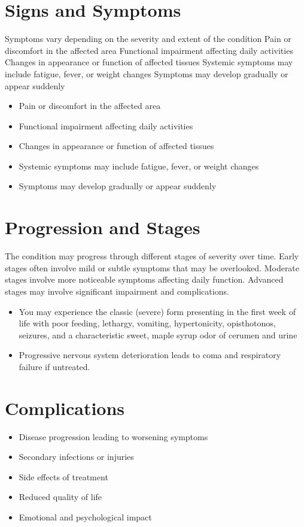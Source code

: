 \section{Signs and Symptoms}
Symptoms vary depending on the severity and extent of the condition Pain or discomfort in the affected area Functional impairment affecting daily activities Changes in appearance or function of affected tissues Systemic symptoms may include fatigue, fever, or weight changes Symptoms may develop gradually or appear suddenly

\begin{itemize}[noitemsep]
  \item Pain or discomfort in the affected area
  \item Functional impairment affecting daily activities
  \item Changes in appearance or function of affected tissues
  \item Systemic symptoms may include fatigue, fever, or weight changes
  \item Symptoms may develop gradually or appear suddenly
\end{itemize}
\section{Progression and Stages}
The condition may progress through different stages of severity over time. Early stages often involve mild or subtle symptoms that may be overlooked. Moderate stages involve more noticeable symptoms affecting daily function. Advanced stages may involve significant impairment and complications.

\begin{itemize}[noitemsep]
  \item You may experience the classic (severe) form presenting in the first week of life with poor feeding, lethargy, vomiting, hypertonicity, opisthotonos, seizures, and a characteristic sweet, maple syrup odor of cerumen and urine
  \item Progressive nervous system deterioration leads to coma and respiratory failure if untreated.
\end{itemize}
\section{Complications}
\begin{itemize}[noitemsep]
  \item Disease progression leading to worsening symptoms
  \item Secondary infections or injuries
  \item Side effects of treatment
  \item Reduced quality of life
  \item Emotional and psychological impact
\end{itemize}
